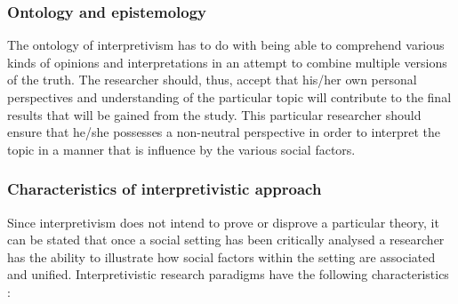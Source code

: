 \subsubsection{Ontology and epistemology}
The ontology of interpretivism has to do with being able to comprehend various kinds of opinions and interpretations in an attempt to combine multiple versions of the truth. The researcher should, thus, accept that his/her own personal perspectives and understanding of the particular topic will contribute to the final results that will be gained from the study.  This particular researcher should ensure that he/she possesses a non-neutral perspective in order to interpret the topic in a manner that is influence by the various social factors.
\subsubsection{Characteristics of interpretivistic approach}
Since interpretivism does not intend to prove or disprove a particular theory, it can be stated that once a social setting has been critically analysed a researcher has the ability to illustrate how social factors within the setting are associated and unified. Interpretivistic research paradigms have the following characteristics \citep{OatesJ2006}: 
